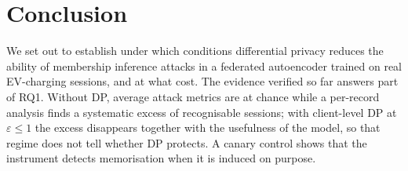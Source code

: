 
\section{Conclusion}
\label{sec:conclusion}

We set out to establish under which conditions differential privacy reduces
the ability of membership inference attacks in a federated autoencoder trained
on real EV-charging sessions, and at what cost. The evidence verified so far
answers part of RQ1. Without DP, average attack metrics are at chance while a
per-record analysis finds a systematic excess of recognisable sessions; with
client-level DP at $\varepsilon \le 1$ the excess disappears together with the
usefulness of the model, so that regime does not tell whether DP protects. A
canary control shows that the instrument detects memorisation when it is
induced on purpose. 
